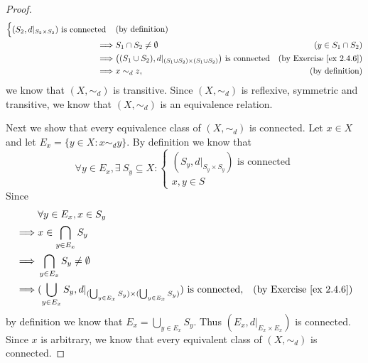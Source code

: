\begin{proof}
\begin{align*}
\begin{cases}
                                                       (S_2, d|_{S_2 \times S_2}) \text{ is connected}
                                                   \end{cases}                                       & \text{(by definition)}                     \\
        \implies & S_1 \cap S_2 \neq \emptyset                                                              & (y \in S_1 \cap S_2)                \\
        \implies & \big((S_1 \cup S_2), d|_{(S_1 \cup S_2) \times (S_1 \cup S_2)}\big) \text{ is connected} & \text{(by Exercise \ref{ex 2.4.6})} \\
        \implies & x \sim_d z,                                                                              & \text{(by definition)}
    \end{align*}
    we know that \((X, \sim_d)\) is transitive.
    Since \((X, \sim_d)\) is reflexive, symmetric and transitive, we know that \((X, \sim_d)\) is an equivalence relation.

    Next we show that every equivalence class of \((X, \sim_d)\) is connected.
    Let \(x \in X\) and let \(E_x = \{y \in X : x \sim_d y\}\).
    By definition we know that
    \[
        \forall y \in E_x, \exists\ S_y \subseteq X : \begin{cases}
            (S_y, d|_{S_y \times S_y}) \text{ is connected} \\
            x, y \in S
        \end{cases}
    \]
    Since
    \begin{align*}
                 & \forall y \in E_x, x \in S_y                                                                                                                           \\
        \implies & x \in \bigcap_{y \in E_x} S_y                                                                                                                          \\
        \implies & \bigcap_{y \in E_x} S_y \neq \emptyset                                                                                                                 \\
        \implies & (\bigcup_{y \in E_x} S_y, d|_{(\bigcup_{y \in E_x} S_y) \times (\bigcup_{y \in E_x} S_y)}) \text{ is connected}, & \text{(by Exercise \ref{ex 2.4.6})}
    \end{align*}
    by definition we know that \(E_x = \bigcup_{y \in E_x} S_y\).
    Thus \((E_x, d|_{E_x \times E_x})\) is connected.
    Since \(x\) is arbitrary, we know that every equivalent class of \((X, \sim_d)\) is connected.


\end{proof}
